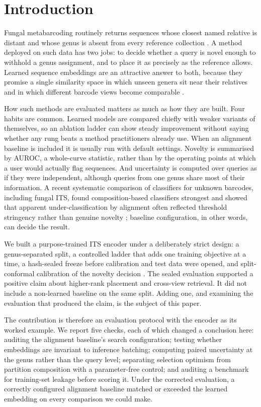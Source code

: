 \documentclass[11pt]{article}
\begin{document}
\section{Introduction}
Fungal metabarcoding routinely returns sequences whose closest named relative
is distant and whose genus is absent from every reference collection
\cite{nilsson2019unite}. A method deployed on such data has two jobs: to decide
whether a query is novel enough to withhold a genus assignment, and to place it
as precisely as the reference allows. Learned sequence embeddings are an
attractive answer to both, because they promise a single similarity space in
which unseen genera sit near their relatives and in which different barcode
views become comparable
\cite{badirli2021zeroshot,badirli2023classifying,romeijn2024mycoai}.

How such methods are evaluated matters as much as how they are built. Four
habits are common. Learned models are compared chiefly with weaker variants of
themselves, so an ablation ladder can show steady improvement without saying
whether any rung beats a method practitioners already use. When an alignment
baseline is included it is usually run with default settings. Novelty is
summarised by AUROC, a whole-curve statistic, rather than by the operating
points at which a user would actually flag sequences. And uncertainty is
computed over queries as if they were independent, although queries from one
genus share most of their information. A recent systematic comparison of
classifiers for unknown barcodes, including fungal ITS, found composition-based
classifiers strongest and showed that apparent under-classification by
alignment often reflected threshold stringency rather than genuine novelty
\cite{orsholm2026unseen}; baseline configuration, in other words, can decide the
result.

We built a purpose-trained ITS encoder under a deliberately strict design: a
genus-separated split, a controlled ladder that adds one training objective at a
time, a hash-sealed freeze before calibration and test data were opened, and
split-conformal calibration of the novelty decision \cite{obrien2026flag}. The
sealed evaluation supported a positive claim about higher-rank placement and
cross-view retrieval. It did not include a non-learned baseline on the same
split. Adding one, and examining the evaluation that produced the claim, is the
subject of this paper.

The contribution is therefore an evaluation protocol with the encoder as its
worked example. We report five checks, each of which changed a conclusion here:
auditing the alignment baseline's search configuration; testing whether
embeddings are invariant to inference batching; computing paired uncertainty at
the genus rather than the query level; separating selection optimism from
partition composition with a parameter-free control; and auditing a benchmark
for training-set leakage before scoring it. Under the corrected evaluation, a
correctly configured alignment baseline matched or exceeded the learned
embedding on every comparison we could make.
\end{document}
